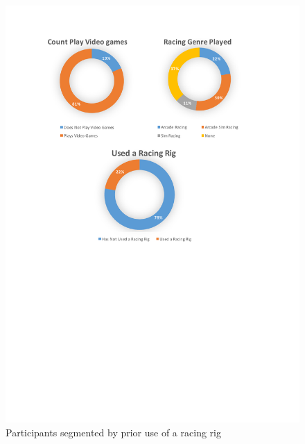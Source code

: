 \begin{figure}
	\centering
	\begin{minipage}{0.45\textwidth}
		\centering
		\includegraphics[width=\textwidth]{charts/usedARacingRig.pdf}
		\caption[Participants segmented by prior use of a racing rig]{Participants segmented by prior use of a racing rig}
		\label{fig:chart-usedARacingRig}
	\end{minipage}\hfill
	\begin{minipage}{0.45\textwidth}
		\centering

\end{minipage}
\end{figure}
